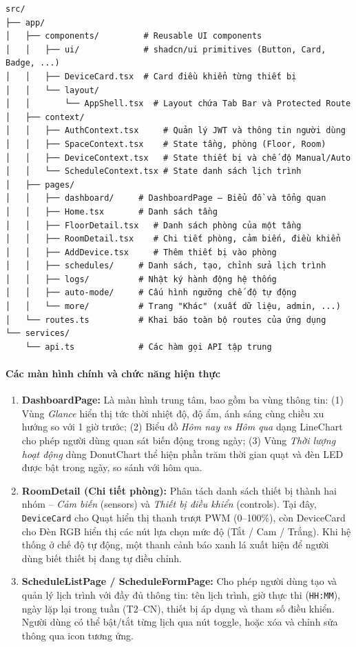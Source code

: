 \begin{verbatim}
src/
├── app/
│   ├── components/         # Reusable UI components
│   │   ├── ui/             # shadcn/ui primitives (Button, Card, Badge, ...)
│   │   ├── DeviceCard.tsx  # Card điều khiển từng thiết bị
│   │   └── layout/
│   │       └── AppShell.tsx  # Layout chứa Tab Bar và Protected Route
│   ├── context/
│   │   ├── AuthContext.tsx     # Quản lý JWT và thông tin người dùng
│   │   ├── SpaceContext.tsx    # State tầng, phòng (Floor, Room)
│   │   ├── DeviceContext.tsx   # State thiết bị và chế độ Manual/Auto
│   │   └── ScheduleContext.tsx # State danh sách lịch trình
│   ├── pages/
│   │   ├── dashboard/     # DashboardPage – Biểu đồ và tổng quan
│   │   ├── Home.tsx       # Danh sách tầng
│   │   ├── FloorDetail.tsx   # Danh sách phòng của một tầng
│   │   ├── RoomDetail.tsx    # Chi tiết phòng, cảm biến, điều khiển
│   │   ├── AddDevice.tsx     # Thêm thiết bị vào phòng
│   │   ├── schedules/     # Danh sách, tạo, chỉnh sửa lịch trình
│   │   ├── logs/          # Nhật ký hành động hệ thống
│   │   ├── auto-mode/     # Cấu hình ngưỡng chế độ tự động
│   │   └── more/          # Trang "Khác" (xuất dữ liệu, admin, ...)
│   └── routes.ts          # Khai báo toàn bộ routes của ứng dụng
└── services/
    └── api.ts             # Các hàm gọi API tập trung
\end{verbatim}

\paragraph{Các màn hình chính và chức năng hiện thực}

\begin{enumerate}
    \item \textbf{DashboardPage:} Là màn hình trung tâm, bao gồm ba vùng thông tin: (1) Vùng \textit{Glance} hiển thị tức thời nhiệt độ, độ ẩm, ánh sáng cùng chiều xu hướng so với 1 giờ trước; (2) Biểu đồ \textit{Hôm nay vs Hôm qua} dạng LineChart cho phép người dùng quan sát biến động trong ngày; (3) Vùng \textit{Thời lượng hoạt động} dùng DonutChart thể hiện phần trăm thời gian quạt và đèn LED được bật trong ngày, so sánh với hôm qua.

    \item \textbf{RoomDetail (Chi tiết phòng):} Phân tách danh sách thiết bị thành hai nhóm – \textit{Cảm biến} (sensors) và \textit{Thiết bị điều khiển} (controls). Tại đây, \texttt{DeviceCard} cho Quạt hiển thị thanh trượt PWM (0–100\%), còn DeviceCard cho Đèn RGB hiển thị các nút lựa chọn mức độ (Tắt / Cam / Trắng). Khi hệ thống ở chế độ tự động, một thanh cảnh báo xanh lá xuất hiện để người dùng biết thiết bị đang tự điều chỉnh.

    \item \textbf{ScheduleListPage / ScheduleFormPage:} Cho phép người dùng tạo và quản lý lịch trình với đầy đủ thông tin: tên lịch trình, giờ thực thi (\texttt{HH:MM}), ngày lặp lại trong tuần (T2–CN), thiết bị áp dụng và tham số điều khiển. Người dùng có thể bật/tắt từng lịch qua nút toggle, hoặc xóa và chỉnh sửa thông qua icon tương ứng.
\end{enumerate}

